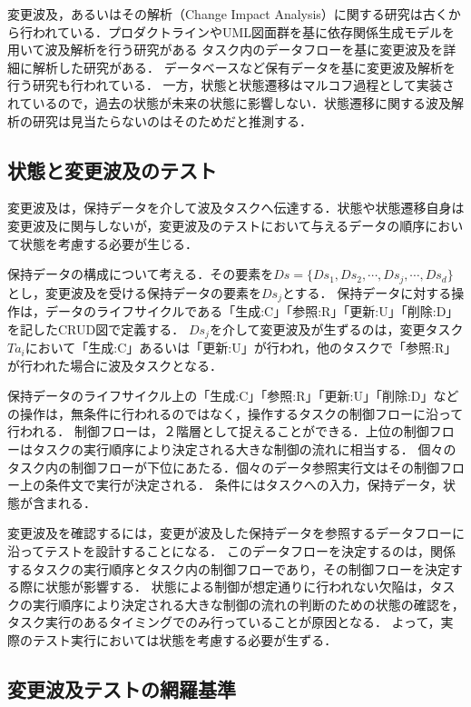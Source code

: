 変更波及，あるいはその解析（Change Impact Analysis）に関する研究は古くから行われている．プロダクトラインやUML図面群を基に依存関係生成モデルを用いて波及解析を行う研究がある\cite{gomaa2005designing}\cite{2008kotani}\cite{briand2003impact}
タスク内のデータフローを基に変更波及を詳細に解析した研究がある\cite{campbell1990}．
データベースなど保有データを基に変更波及解析を行う研究も行われている\cite{maule2008impact}\cite{2011ogawa}．
一方，状態と状態遷移はマルコフ過程として実装されているので，過去の状態が未来の状態に影響しない．状態遷移に関する波及解析の研究は見当たらないのはそのためだと推測する．%
\cite{LSOF}
\cite{kang1990feature}
\subsection{状態と変更波及のテスト}
変更波及は，保持データを介して波及タスクへ伝達する．状態や状態遷移自身は変更波及に関与しないが，変更波及のテストにおいて与えるデータの順序において状態を考慮する必要が生じる．

保持データの構成について考える．その要素を$Ds=\{Ds_1,Ds_2,\cdots,Ds_j,\cdots,Ds_d\}$とし，変更波及を受ける保持データの要素を$Ds_j$とする．
保持データに対する操作は，データのライフサイクルである「生成:C」「参照:R」「更新:U」「削除:D」を記したCRUD図で定義する．
$Ds_j$を介して変更波及が生ずるのは，変更タスク$Ta_i$において「生成:C」あるいは「更新:U」が行われ，他のタスクで「参照:R」が行われた場合に波及タスクとなる．

保持データのライフサイクル上の「生成:C」「参照:R」「更新:U」「削除:D」などの操作は，無条件に行われるのではなく，操作するタスクの制御フローに沿って行われる．
制御フローは，２階層として捉えることができる．上位の制御フローはタスクの実行順序により決定される大きな制御の流れに相当する．
個々のタスク内の制御フローが下位にあたる．個々のデータ参照実行文はその制御フロー上の条件文で実行が決定される．
条件にはタスクへの入力，保持データ，状態が含まれる．

変更波及を確認するには，変更が波及した保持データを参照するデータフローに沿ってテストを設計することになる．
このデータフローを決定するのは，関係するタスクの実行順序とタスク内の制御フローであり，その制御フローを決定する際に状態が影響する．
状態による制御が想定通りに行われない欠陥は，タスクの実行順序により決定される大きな制御の流れの判断のための状態の確認を，タスク実行のあるタイミングでのみ行っていることが原因となる．%
よって，実際のテスト実行においては状態を考慮する必要が生ずる．

\subsection{変更波及テストの網羅基準}

